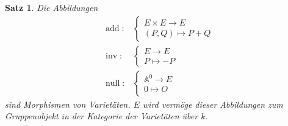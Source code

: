\documentclass{amsart}
\theoremstyle{plain}
\newtheorem{proposition}[subsection]{Satz}
\theoremstyle{definition}
\newcommand{\affinespace}{\mathds{A}}
\begin{document}
\begin{proposition}
	Die Abbildungen
	\begin{align*}
		\operatorname{add} \colon &
		\begin{cases}
			E \times E \rightarrow E \\
			(P, Q) \mapsto P + Q
		\end{cases} \\
		\operatorname{inv} \colon &
		\begin{cases}
			E \rightarrow E \\
			P \mapsto -P
		\end{cases} \\
		\operatorname{null} \colon &
		\begin{cases}
			\affinespace^0 \rightarrow E \\
			0 \mapsto O
		\end{cases}
	\end{align*}
	sind Morphismen von Varietäten. $E$ wird vermöge dieser Abbildungen zum Gruppenobjekt in der Kategorie der Varietäten über $k$.
\end{proposition}

\printbibliography
\end{document}
